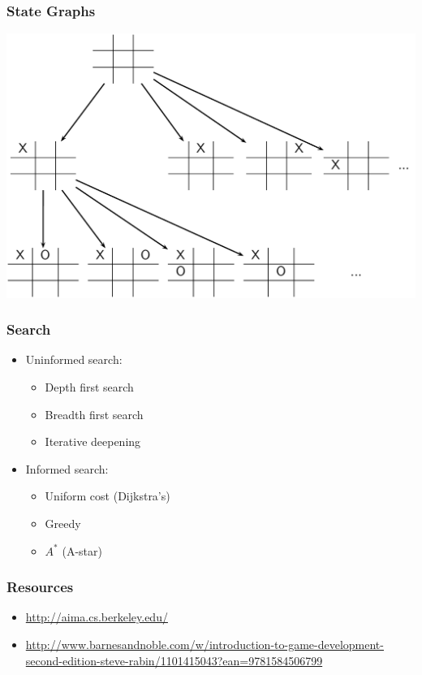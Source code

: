 \documentclass[handout,t,compress]{beamer}
\newcommand{\bframe}[1]{\begin{frame}[fragile]\frametitle{{#1}}}
\begin{document}
\bframe{State Graphs}
\includegraphics[scale=0.25]{graphsfigure03.png}


\end{frame}

\bframe{Search}
\begin{itemize}
\item Uninformed search:
\begin{itemize}
\item Depth first search
\item Breadth first search
\item Iterative deepening
\end{itemize}
\item Informed search:
\begin{itemize}
\item Uniform cost (Dijkstra's)
\item Greedy
\item $A^*$ (A-star)
\end{itemize}
\end{itemize}
\end{frame}

\bframe{Resources}
\begin{itemize}
\item \url{http://aima.cs.berkeley.edu/}
\item \url{http://www.barnesandnoble.com/w/introduction-to-game-development-second-edition-steve-rabin/1101415043?ean=9781584506799}
\end{itemize}
\end{frame}
\end{document}
